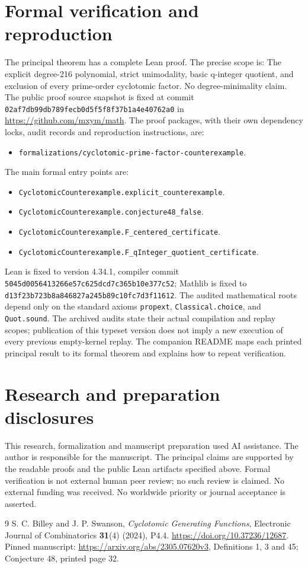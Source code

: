 \documentclass[11pt]{article}
\begin{document}
\section{Formal verification and reproduction}
The principal theorem has a complete Lean proof. The precise scope is:
The explicit degree-216 polynomial, strict unimodality, basic q-integer quotient, and exclusion of every prime-order cyclotomic factor. No degree-minimality claim.
The public proof source snapshot is fixed at commit
\nolinkurl{02af7db99db789fecb0d5f5f8f37b1a4e40762a0} in \url{https://github.com/mxym/math}.
The proof packages, with their own dependency locks, audit records and
reproduction instructions, are:
\begin{itemize}
\item \nolinkurl{formalizations/cyclotomic-prime-factor-counterexample}.
\end{itemize}
The main formal entry points are:
\begin{itemize}
\item \nolinkurl{CyclotomicCounterexample.explicit_counterexample}.
\item \nolinkurl{CyclotomicCounterexample.conjecture48_false}.
\item \nolinkurl{CyclotomicCounterexample.F_centered_certificate}.
\item \nolinkurl{CyclotomicCounterexample.F_qInteger_quotient_certificate}.
\end{itemize}
Lean is fixed to version 4.34.1, compiler commit
\nolinkurl{5045d0056413266e57c625dcd7c365b10e377c52}; Mathlib is fixed to
\nolinkurl{d13f23b723b8a846827a245b89c10fc7d3f11612}.
The audited mathematical roots depend only on the standard axioms
\texttt{propext}, \texttt{Classical.choice}, and \texttt{Quot.sound}.
The archived audits state their actual compilation and replay scopes;
publication of this typeset version does not imply a new execution of every
previous empty-kernel replay. The companion README maps each printed
principal result to its formal theorem and explains how to repeat verification.

\section*{Research and preparation disclosures}
This research, formalization and manuscript preparation used AI assistance.
The author is responsible for the manuscript. The principal claims are
supported by the readable proofs and the public Lean artifacts specified
above. Formal verification is not external human peer review; no such review
is claimed. No external funding was received. No worldwide priority or
journal acceptance is asserted.
\begin{thebibliography}{9}
 S. C. Billey and J. P. Swanson,
\emph{Cyclotomic Generating Functions}, Electronic Journal of Combinatorics
\textbf{31}(4) (2024), P4.4. \url{https://doi.org/10.37236/12687}.
Pinned manuscript: \url{https://arxiv.org/abs/2305.07620v3},
Definitions 1, 3 and 45; Conjecture 48, printed page 32.
\end{thebibliography}
\end{document}

